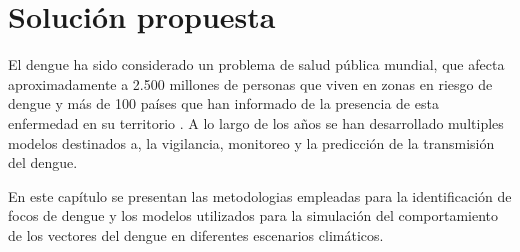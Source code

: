\chapter{Solución propuesta}

El dengue ha sido considerado un problema de salud pública mundial, que afecta aproximadamente a
2.500 millones de personas que viven en zonas en riesgo de dengue y más de 100 países que han
informado de la presencia de esta enfermedad en su territorio \citet{gustavo2006dengue}. A lo
largo de los años se han desarrollado multiples modelos destinados a, la vigilancia, monitoreo y
la predicción de la transmisión del dengue.

En este capítulo se presentan las metodologias empleadas para la identificación de focos de dengue
y los modelos utilizados para la simulación del comportamiento de los vectores del dengue en
diferentes escenarios climáticos.




%
%
%
